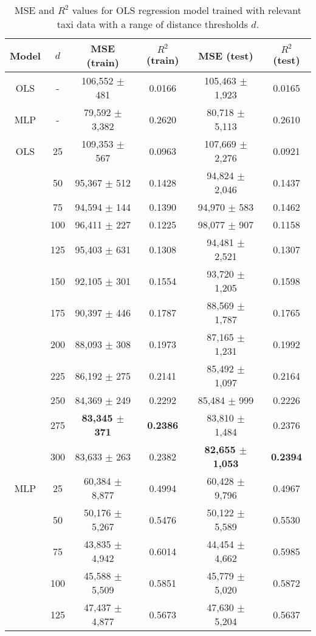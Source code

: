 \documentclass[useAMS, referee, usenatbib]{biom}
\begin{document}
\begin{table}
\caption{MSE and $R^2$ values for OLS regression model trained with relevant taxi data with a range of distance thresholds $d$.}
\label{t:full_data_performance}
\begin{center}
\resizebox{\columnwidth}{!}
{
 \begin{tabular}{||c|c|c|c|c|c||}
 \hline
 Model & $d$ & MSE (train) & $R^2$ (train) & MSE (test) & $R^2$ (test) \\
 \hline
 OLS & - & 106,552 $\pm$ 481 & 0.0166 & 105,463 $\pm$ 1,923 & 0.0165 \\
 MLP & - & 79,592 $\pm$ 3,382 & 0.2620 & 80,718 $\pm$ 5,113 & 0.2610 \\
 \hline
 OLS & 25 & 109,353 $\pm$ 567 & 0.0963 & 107,669 $\pm$ 2,276 & 0.0921 \\
 & 50 & 95,367 $\pm$ 512 & 0.1428 & 94,824 $\pm$ 2,046 & 0.1437 \\
 & 75 & 94,594 $\pm$ 144 & 0.1390 & 94,970 $\pm$ 583 & 0.1462 \\
 & 100 & 96,411 $\pm$ 227 & 0.1225 & 98,077 $\pm$ 907 & 0.1158 \\
 & 125 & 95,403 $\pm$ 631 & 0.1308 & 94,481 $\pm$ 2,521 & 0.1307 \\
 & 150 & 92,105 $\pm$ 301 & 0.1554 & 93,720 $\pm$ 1,205 & 0.1598 \\
 & 175 & 90,397 $\pm$ 446 & 0.1787 & 88,569 $\pm$ 1,787 & 0.1765 \\
 & 200 & 88,093 $\pm$ 308 & 0.1973 & 87,165 $\pm$ 1,231 & 0.1992 \\
 & 225 & 86,192 $\pm$ 275 & 0.2141 & 85,492 $\pm$ 1,097 & 0.2164 \\
 & 250 & 84,369 $\pm$ 249 & 0.2292 & 85,484 $\pm$ 999 & 0.2226 \\
 & 275 & \textbf{83,345 $\pm$ 371} & \textbf{0.2386} & 83,810 $\pm$ 1,484 & 0.2376 \\
 & 300 & 83,633 $\pm$ 263 & 0.2382 & \textbf{82,655 $\pm$ 1,053} & \textbf{0.2394} \\
 \hline
 MLP & 25 & 60,384 $\pm$ 8,877 & 0.4994 & 60,428 $\pm$ 9,796 & 0.4967 \\
 & 50 & 50,176 $\pm$ 5,267 & 0.5476 & 50,122 $\pm$ 5,589 & 0.5530 \\
 & 75 & 43,835 $\pm$ 4,942 & 0.6014 & 44,454 $\pm$ 4,662 & 0.5985 \\
 & 100 & 45,588 $\pm$ 5,509 & 0.5851 & 45,779 $\pm$ 5,020 & 0.5872 \\
 & 125 & 47,437 $\pm$ 4,877 & 0.5673 & 47,630 $\pm$ 5,204 & 0.5637 \\

\end{tabular}}
\end{center}
\end{table}
\end{document}
